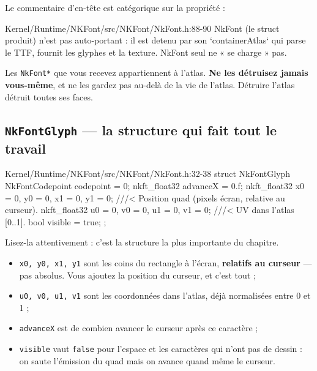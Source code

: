Le commentaire d'en-tête est catégorique sur la propriété :

\begin{nkcode}{Kernel/Runtime/NKFont/src/NKFont/NkFont.h:88-90}
 NkFont (le struct produit) n'est pas auto-portant : il est detenu par
 son `containerAtlas` qui parse le TTF, fournit les glyphes et la
 texture. NkFont seul ne « se charge » pas.
\end{nkcode}

\begin{nkretenir}
Les \texttt{NkFont*} que vous recevez appartiennent à l'atlas. \textbf{Ne les
détruisez jamais vous-même}, et ne les gardez pas au-delà de la vie de l'atlas.
Détruire l'atlas détruit toutes ses faces.
\end{nkretenir}

\subsection{\texttt{NkFontGlyph} — la structure qui fait tout le travail}

\begin{nkcode}{Kernel/Runtime/NKFont/src/NKFont/NkFont.h:32-38}
    struct NkFontGlyph {
            NkFontCodepoint codepoint = 0;
            nkft_float32 advanceX = 0.f;
            nkft_float32 x0 = 0, y0 = 0, x1 = 0, y1 = 0; ///< Position quad (pixels écran, relative au curseur).
            nkft_float32 u0 = 0, v0 = 0, u1 = 0, v1 = 0; ///< UV dans l'atlas [0..1].
            bool visible = true;
    };
\end{nkcode}

Lisez-la attentivement : c'est la structure la plus importante du chapitre.

\begin{itemize}
  \item \texttt{x0, y0, x1, y1} sont les coins du rectangle à l'écran,
        \textbf{relatifs au curseur} — pas absolus. Vous ajoutez la position du
        curseur, et c'est tout ;
  \item \texttt{u0, v0, u1, v1} sont les coordonnées dans l'atlas, déjà
        normalisées entre 0 et 1 ;
  \item \texttt{advanceX} est de combien avancer le curseur après ce caractère ;
  \item \texttt{visible} vaut \texttt{false} pour l'espace et les caractères qui
        n'ont pas de dessin : on saute l'émission du quad mais on avance quand
        même le curseur.
\end{itemize}

